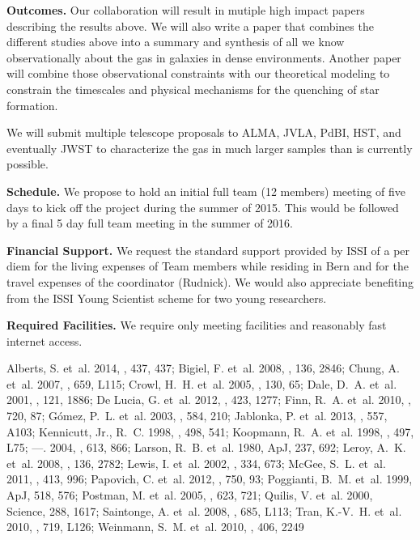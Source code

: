 \documentclass[11pt]{article}
\begin{document}
\textbf{Outcomes.}  Our collaboration will result in mutiple high
impact papers describing the results above.  We will also write a
paper that combines the different studies above into a summary and
synthesis of all we know observationally about the gas in galaxies in
dense environments.  Another paper will combine those observational
constraints with our theoretical modeling to constrain the timescales
and physical mechanisms for the quenching of star formation.

We will submit multiple telescope proposals to ALMA, JVLA, PdBI, HST,
and eventually JWST to characterize the gas in much larger samples
than is currently possible.

\textbf{Schedule.} We propose to hold an initial full team (12 members)
meeting of five days to kick off the project during the summer of
2015. This would be followed by a final 5 day full team meeting in
the summer of 2016.

\textbf{Financial Support.}  We request the standard support provided
by ISSI of a per diem for the living expenses of Team members while
residing in Bern and for the travel expenses of the coordinator
(Rudnick). We would also appreciate benefiting from the ISSI Young
Scientist scheme for two young researchers.

\textbf{Required Facilities.}  We require only meeting facilities and
reasonably fast internet access.

\footnotesize{{Alberts}, S. {et~al.} 2014, \mnras, 437, 437; {Bigiel}, F. {et~al.} 2008, \aj, 136, 2846; {Chung}, A. {et~al.} 2007, \apjl, 659, L115; {Crowl}, H.~H. {et~al.} 2005, \aj, 130, 65; {Dale}, D.~A. {et~al.} 2001, \aj, 121, 1886; {De Lucia}, G. {et~al.} 2012, \mnras, 423, 1277; {Finn}, R.~A. {et~al.} 2010, \apj, 720, 87; {G{\' o}mez}, P.~L. {et~al.} 2003, \apj, 584, 210; {Jablonka}, P. {et~al.} 2013, \aap, 557, A103; {Kennicutt}, Jr., R.~C. 1998, \apj, 498, 541; {Koopmann}, R.~A. {et~al.} 1998, \apjl, 497, L75; ---. 2004, \apj, 613, 866; {Larson}, R.~B. {et~al.} 1980, ApJ, 237, 692; {Leroy}, A.~K. {et~al.} 2008, \aj, 136, 2782; {Lewis}, I. {et~al.} 2002, \mnras, 334, 673; {McGee}, S.~L. {et~al.} 2011, \mnras, 413, 996; {Papovich}, C. {et~al.} 2012, \apj, 750, 93; {Poggianti}, B.~M. {et~al.} 1999, ApJ, 518, 576; {Postman}, M. {et~al.} 2005, \apj, 623, 721; {Quilis}, V. {et~al.} 2000, Science, 288, 1617; {Saintonge}, A. {et~al.} 2008, \apjl, 685, L113; {Tran}, K.-V.~H. {et~al.} 2010, \apjl, 719, L126; {Weinmann}, S.~M. {et~al.} 2010, \mnras, 406, 2249}

\end{document}
